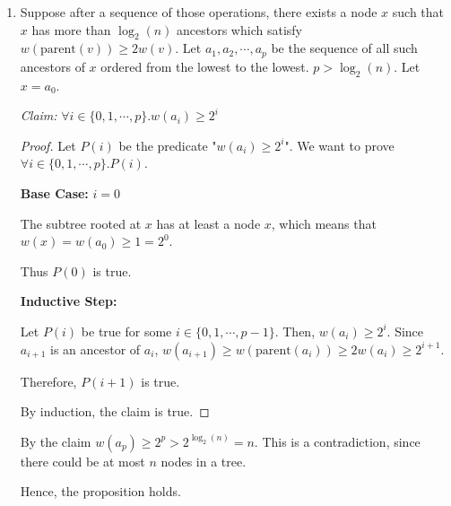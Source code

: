 \documentclass[10pt]{article}
\begin{document}
\begin{enumerate}

	\begin{comment}
	Prove that, if n MAKE-SET operations and any number of LINK and FIND-SET operations have 
	been performed, then any node has at most $\log_2(n)$ ancestor v, 
	such that $w(parent(v)) \geq 2w(v)$.
	\end{comment}
	\item
		Suppose after a sequence of those operations, there exists a node $x$
		such that $x$ has more than $\log_2(n)$ ancestors which satisfy
		$w(\text{parent}(v)) \geq 2w(v)$. 
		Let $a_1, a_2, \cdots, a_p$ be the sequence of all such ancestors of
		$x$ ordered from the lowest to the lowest. 
		$p > \log_2(n)$.
		Let $x = a_0$. 

		\textit{Claim:} $\forall i \in \{0, 1, \cdots , p\}. w(a_i) \geq 2^i$
		\begin{proof}
			Let $P(i)$ be the predicate "$w(a_i) \geq 2^i$". 
			We want to prove $\forall i \in \{0, 1, \cdots, p\}. P(i)$.
			
			\textbf{Base Case:} $i = 0$
			\begin{addmargin}[1em]{0em}
				The subtree rooted at $x$ has at least a node $x$, which means that
				$w(x) = w(a_0) \geq 1 = 2^0$.

				Thus $P(0)$ is true.
			\end{addmargin}

			\textbf{Inductive Step:}
			\begin{addmargin}[1em]{0em}
				Let $P(i)$ be true for some $i \in \{0, 1, \cdots, p-1\}$.
				Then, $w(a_i) \geq 2^i$.
				Since $a_{i+1}$ is an ancestor of $a_i$, $w(a_{i+1}) \geq
				w(\text{parent}(a_i)) \geq 2w(a_i) \geq 2^{i+1}$.

				Therefore, $P(i+1)$ is true.
			\end{addmargin}

			By induction, the claim is true. 
		\end{proof}

		By the claim $w(a_p) \geq 2^{p} > 2^{\log_2 (n)} = n$.
		This is a contradiction, since there could be at most $n$ nodes in a
		tree.

		Hence, the proposition  holds.


	\begin{comment}
	Using the accounting method, prove that the amartized complexity of MAKE-SET is $O(1)$ 
	and the amartized complexity of LINK and FIND-SET are $O(\log(n))$, 
	where $n$ is the number of MAKE-SET operations performed.


\end{comment}
\end{enumerate}
\end{document}
